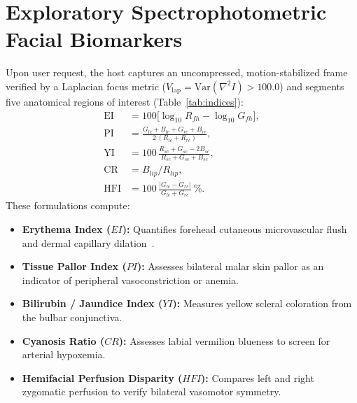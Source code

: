 \documentclass[journal]{IEEEtran}
\begin{document}
\section{Exploratory Spectrophotometric Facial Biomarkers}
\label{sec:color}

Upon user request, the host captures an uncompressed, motion-stabilized frame verified by a Laplacian focus metric ($V_{\mathrm{lap}} = \mathrm{Var}(\nabla^2 I) > 100.0$) and segments five anatomical regions of interest (Table~\ref{tab:indices}):
\begin{align}
  \mathrm{EI} &= 100\big[\log_{10} R_{fh} - \log_{10} G_{fh}\big], \label{eq:ei}\\
  \mathrm{PI} &= \frac{G_{lc}+B_{lc}+G_{rc}+B_{rc}}{2\,(R_{lc}+R_{rc})}, \label{eq:pi}\\
  \mathrm{YI} &= 100\,\frac{R_{sc}+G_{sc}-2B_{sc}}{R_{sc}+G_{sc}+B_{sc}}, \label{eq:yi}\\
  \mathrm{CR} &= B_{lip}/R_{lip}, \label{eq:cr}\\
  \mathrm{HFI} &= 100\,\frac{|G_{lc}-G_{rc}|}{G_{lc}+G_{rc}}\ \%. \label{eq:hfi}
\end{align}
These formulations compute:
\begin{itemize}
  \item \textbf{Erythema Index ($EI$):} Quantifies forehead cutaneous microvascular flush and dermal capillary dilation~\cite{diffey1984}.
  \item \textbf{Tissue Pallor Index ($PI$):} Assesses bilateral malar skin pallor as an indicator of peripheral vasoconstriction or anemia.
  \item \textbf{Bilirubin / Jaundice Index ($YI$):} Measures yellow scleral coloration from the bulbar conjunctiva.
  \item \textbf{Cyanosis Ratio ($CR$):} Assesses labial vermilion blueness to screen for arterial hypoxemia.
  \item \textbf{Hemifacial Perfusion Disparity ($HFI$):} Compares left and right zygomatic perfusion to verify bilateral vasomotor symmetry.
\end{itemize}
\end{document}

